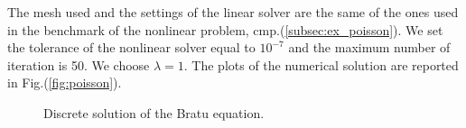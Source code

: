 The mesh used and the settings of the linear solver are the same of the ones used in the benchmark of the nonlinear problem, cmp.(\ref{subsec:ex_poisson}). We set the tolerance of the nonlinear solver equal to $10^{-7}$ and the maximum number of iteration is 50. We choose $\lambda=1$. The plots of the numerical solution are reported in Fig.(\ref{fig:poisson}).

\begin{figure}
\centering
{}
\caption{Discrete solution of the Bratu equation.}\label{fig:bratu}
\end{figure}

